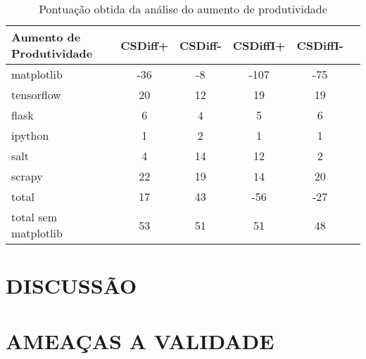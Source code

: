 \begin{table}[ht]
	\begin{center}
		\begin{tabular}{|l|c|c|c|c|c|}
			\hline
			\textbf{Aumento de Produtividade} & \textbf{CSDiff+} & \textbf{CSDiff-} & \textbf{CSDiffI+} & \textbf{CSDiffI-} \\
			\hline
			matplotlib                        & -36              & -8               & -107              & -75               \\
			tensorflow                        & 20               & 12               & 19                & 19                \\
			flask                             & 6                & 4                & 5                 & 6                 \\
			ipython                           & 1                & 2                & 1                 & 1                 \\
			salt                              & 4                & 14               & 12                & 2                 \\
			scrapy                            & 22               & 19               & 14                & 20                \\
			total                             & 17               & 43               & -56               & -27               \\
			total sem matplotlib              & 53               & 51               & 51                & 48                \\
			\hline
		\end{tabular}
	\end{center}
	\caption{Pontuação obtida da análise do aumento de produtividade}\label{tabela_produtividade}
\end{table}
\section{DISCUSSÃO}\label{discussao}
\section{AMEAÇAS A VALIDADE}



















































